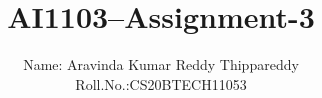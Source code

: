 \documentclass[journal,12pt,twocolumn]{IEEEtran}
\DeclareMathOperator*{\Res}{Res}
\begin{document}
\newcommand{\BEQA}{\begin{eqnarray}}
\newcommand{\EEQA}{\end{eqnarray}}
\newcommand{\define}{\stackrel{\triangle}{=}}

\raggedbottom
\setlength{\parindent}{0pt}
\providecommand{\mbf}{\mathbf}
\providecommand{\pr}[1]{\ensuremath{\Pr\left(#1\right)}}
\providecommand{\qfunc}[1]{\ensuremath{Q\left(#1\right)}}
\providecommand{\sbrak}[1]{\ensuremath{{}\left[#1\right]}}
\providecommand{\lsbrak}[1]{\ensuremath{{}\left[#1\right.}}
\providecommand{\rsbrak}[1]{\ensuremath{{}\left.#1\right]}}
\providecommand{\brak}[1]{\ensuremath{\left(#1\right)}}
\providecommand{\lbrak}[1]{\ensuremath{\left(#1\right.}}
\providecommand{\rbrak}[1]{\ensuremath{\left.#1\right)}}
\providecommand{\cbrak}[1]{\ensuremath{\left\{#1\right\}}}
\providecommand{\lcbrak}[1]{\ensuremath{\left\{#1\right.}}
\providecommand{\rcbrak}[1]{\ensuremath{\left.#1\right\}}}
\theoremstyle{remark}
\newtheorem{rem}{Remark}
\newcommand{\sgn}{\mathop{\mathrm{sgn}}}
\providecommand{\abs}[1]{\vert#1\vert}
\providecommand{\res}[1]{\Res\displaylimits_{#1}} 
\providecommand{\norm}[1]{\lVert#1\rVert}
\providecommand{\mtx}[1]{\mathbf{#1}}
\providecommand{\mean}[1]{E[ #1 ]}
\providecommand{\fourier}{\overset{\mathcal{F}}{ \rightleftharpoons}}
\providecommand{\system}{\overset{\mathcal{H}}{ \longleftrightarrow}}
\newcommand{\solution}{\noindent \textbf{Solution: }}
\newcommand{\cosec}{\,\text{cosec}\,}
\providecommand{\dec}[2]{\ensuremath{\overset{#1}{\underset{#2}{\gtrless}}}}
\newcommand{\myvec}[1]{\ensuremath{\begin{pmatrix}#1\end{pmatrix}}}
\newcommand{\mydet}[1]{\ensuremath{\begin{vmatrix}#1\end{vmatrix}}}
\makeatletter
{}
\makeatother
\let\StandardTheFigure\thefigure
\let\vec\mathbf
\renewcommand{\thefigure}{\theproblem}
\def\putbox#1#2#3{\makebox[0in][l]{\makebox[#1][l]{}\raisebox{\baselineskip}[0in][0in]{\raisebox{#2}[0in][0in]{#3}}}}
     \def\rightbox#1{\makebox[0in][r]{#1}}
     \def\centbox#1{\makebox[0in]{#1}}
     \def\topbox#1{\raisebox{-\baselineskip}[0in][0in]{#1}}
     \def\midbox#1{\raisebox{-0.5\baselineskip}[0in][0in]{#1}}
\vspace{3cm}
\title{AI1103--Assignment-3}
\author{Name: Aravinda Kumar Reddy Thippareddy\\Roll.No.:CS20BTECH11053}
\end{document}
